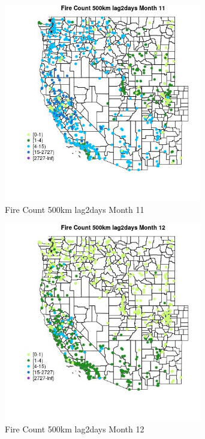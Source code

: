 \begin{figure} 
\centering  
\includegraphics[width=0.77\textwidth]{Code_Outputs/Report_ML_input_PM25_Step4_part_f_de_duplicated_aves_prioritize_24hr_obswNAs_MapObsMo11Fire_Count_500km_lag2days.jpg} 
\caption{\label{fig:Report_ML_input_PM25_Step4_part_f_de_duplicated_aves_prioritize_24hr_obswNAsMapObsMo11Fire_Count_500km_lag2days}Fire Count 500km lag2days Month 11} 
\end{figure} 
 

\begin{figure} 
\centering  
\includegraphics[width=0.77\textwidth]{Code_Outputs/Report_ML_input_PM25_Step4_part_f_de_duplicated_aves_prioritize_24hr_obswNAs_MapObsMo12Fire_Count_500km_lag2days.jpg} 
\caption{\label{fig:Report_ML_input_PM25_Step4_part_f_de_duplicated_aves_prioritize_24hr_obswNAsMapObsMo12Fire_Count_500km_lag2days}Fire Count 500km lag2days Month 12} 
\end{figure} 
 

